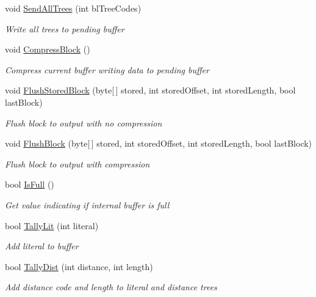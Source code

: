 \begin{DoxyCompactItemize}
void \hyperlink{class_i_c_sharp_code_1_1_sharp_zip_lib_1_1_zip_1_1_compression_1_1_deflater_huffman_a0e6c9eccd350186bf87b782f2227da31}{Send\+All\+Trees} (int bl\+Tree\+Codes)
\begin{DoxyCompactList}\small\item\em Write all trees to pending buffer \end{DoxyCompactList}\item 
void \hyperlink{class_i_c_sharp_code_1_1_sharp_zip_lib_1_1_zip_1_1_compression_1_1_deflater_huffman_a7b15c0717797c4ba0d161639ca985524}{Compress\+Block} ()
\begin{DoxyCompactList}\small\item\em Compress current buffer writing data to pending buffer \end{DoxyCompactList}\item 
void \hyperlink{class_i_c_sharp_code_1_1_sharp_zip_lib_1_1_zip_1_1_compression_1_1_deflater_huffman_a7d0e1539fb4979259b7b4f144206f82a}{Flush\+Stored\+Block} (byte\mbox{[}$\,$\mbox{]} stored, int stored\+Offset, int stored\+Length, bool last\+Block)
\begin{DoxyCompactList}\small\item\em Flush block to output with no compression \end{DoxyCompactList}\item 
void \hyperlink{class_i_c_sharp_code_1_1_sharp_zip_lib_1_1_zip_1_1_compression_1_1_deflater_huffman_a6947ca15ef87e23db8f98e0d5bd82340}{Flush\+Block} (byte\mbox{[}$\,$\mbox{]} stored, int stored\+Offset, int stored\+Length, bool last\+Block)
\begin{DoxyCompactList}\small\item\em Flush block to output with compression \end{DoxyCompactList}\item 
bool \hyperlink{class_i_c_sharp_code_1_1_sharp_zip_lib_1_1_zip_1_1_compression_1_1_deflater_huffman_a6646ac225e009be1d5bf27f557c34116}{Is\+Full} ()
\begin{DoxyCompactList}\small\item\em Get value indicating if internal buffer is full \end{DoxyCompactList}\item 
bool \hyperlink{class_i_c_sharp_code_1_1_sharp_zip_lib_1_1_zip_1_1_compression_1_1_deflater_huffman_a444e33acca851e5312ef6d3596d93833}{Tally\+Lit} (int literal)
\begin{DoxyCompactList}\small\item\em Add literal to buffer \end{DoxyCompactList}\item 
bool \hyperlink{class_i_c_sharp_code_1_1_sharp_zip_lib_1_1_zip_1_1_compression_1_1_deflater_huffman_ac8edc6b7ea91fd984bd5d40a5839a692}{Tally\+Dist} (int distance, int length)
\begin{DoxyCompactList}\small\item\em Add distance code and length to literal and distance trees \end{DoxyCompactList}\end{DoxyCompactItemize}
